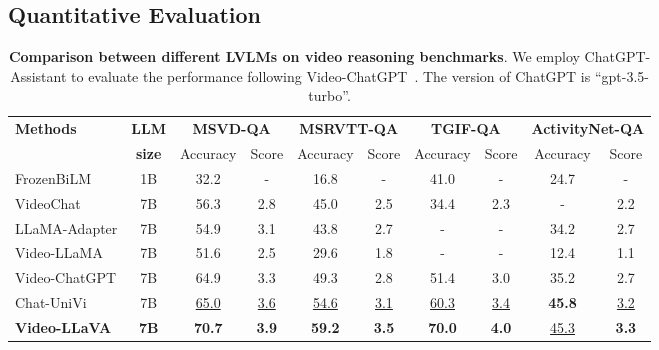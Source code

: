 \subsection{Quantitative Evaluation}

\begin{table*}[t]
  \setlength\tabcolsep{1.55mm}
  \caption{\textbf{Comparison between different LVLMs on video reasoning benchmarks}. We employ ChatGPT-Assistant to evaluate the performance following Video-ChatGPT~\cite{maaz2023video}. The version of ChatGPT is ``gpt-3.5-turbo''.}
  \label{tab:video_qa}
  \centering
  \begin{tabular}{lc|cc|cc|cc|cc}
    \toprule
    \multirow{2}{*}{\textbf{Methods}} & \multirow{1}{*}{\textbf{LLM}} & \multicolumn{2}{c|}{\textbf{MSVD-QA}} & \multicolumn{2}{c|}{\textbf{MSRVTT-QA}} & \multicolumn{2}{c|}{\textbf{TGIF-QA}} & \multicolumn{2}{c}{\textbf{ActivityNet-QA}} \\
     & \multirow{1}{*}{\textbf{size}} & Accuracy & Score & Accuracy & Score & Accuracy & Score & Accuracy & Score \\
     \midrule
    FrozenBiLM & 1B & 32.2 & - & 16.8 & - & 41.0 & - & 24.7 & - \\
    VideoChat & 7B & 56.3 & 2.8 & 45.0 & 2.5 & 34.4 & 2.3 & - & 2.2 \\
    LLaMA-Adapter & 7B & 54.9 & 3.1 & 43.8 & 2.7 & - & - & 34.2 & 2.7 \\
    Video-LLaMA & 7B & 51.6 & 2.5 & 29.6 & 1.8 & - & - & 12.4 & 1.1 \\
    Video-ChatGPT & 7B & 64.9 & 3.3 & 49.3 & 2.8 & 51.4 & 3.0 & 35.2 & 2.7 \\
    Chat-UniVi & 7B & \underline{65.0} & \underline{3.6} & \underline{54.6} & \underline{3.1} & \underline{60.3} & \underline{3.4} & \textbf{45.8} & \underline{3.2} \\
    \rowcolor{blue} \textbf{Video-LLaVA} & \textbf{7B} & \textbf{70.7} & \textbf{3.9} & \textbf{59.2} & \textbf{3.5} & \textbf{70.0} & \textbf{4.0} & \underline{45.3} & \textbf{3.3} \\
    \bottomrule
  \end{tabular}
\end{table*}

